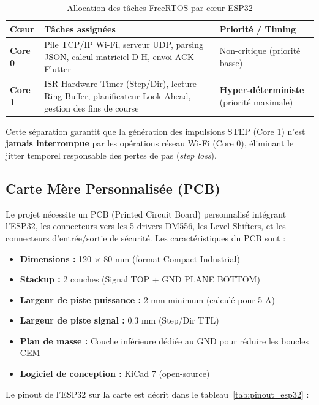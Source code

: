 \begin{table}[htbp]
\centering
\renewcommand{\arraystretch}{1.3}
\begin{tabular}{|l|p{5cm}|p{5cm}|}
\hline
\rowcolor{macouleur!20}
\textbf{Cœur} & \textbf{Tâches assignées} & \textbf{Priorité / Timing} \\
\hline
\textbf{Core 0} & Pile TCP/IP Wi-Fi, serveur UDP, parsing JSON, calcul matriciel D-H, envoi ACK Flutter & Non-critique (priorité basse) \\
\hline
\textbf{Core 1} & ISR Hardware Timer (Step/Dir), lecture Ring Buffer, planificateur Look-Ahead, gestion des fins de course & \textbf{Hyper-déterministe} (priorité maximale) \\
\hline
\end{tabular}
\caption{Allocation des tâches FreeRTOS par cœur ESP32}
\label{tab:freertos_tasks}
\end{table}

Cette séparation garantit que la génération des impulsions STEP (Core 1) n'est \textbf{jamais interrompue} par les opérations réseau Wi-Fi (Core 0), éliminant le jitter temporel responsable des pertes de pas (\textit{step loss}).

\subsection{Carte Mère Personnalisée (PCB)}
Le projet nécessite un PCB (Printed Circuit Board) personnalisé intégrant l'ESP32, les connecteurs vers les 5 drivers DM556, les Level Shifters, et les connecteurs d'entrée/sortie de sécurité. Les caractéristiques du PCB sont :
\begin{itemize}
    \item \textbf{Dimensions :} 120 × 80 mm (format Compact Industrial)
    \item \textbf{Stackup :} 2 couches (Signal TOP + GND PLANE BOTTOM)
    \item \textbf{Largeur de piste puissance :} 2 mm minimum (calculé pour 5 A)
    \item \textbf{Largeur de piste signal :} 0.3 mm (Step/Dir TTL)
    \item \textbf{Plan de masse :} Couche inférieure dédiée au GND pour réduire les boucles CEM
    \item \textbf{Logiciel de conception :} KiCad 7 (open-source)
\end{itemize}

Le pinout de l'ESP32 sur la carte est décrit dans le tableau~\ref{tab:pinout_esp32} :

